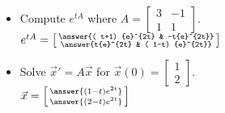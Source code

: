 \documentclass{ximera}
\begin{document}
\begin{exercise}%
    \begin{itemize}
        \item Compute $e^{tA}$ where
        $A=\left[ \begin{smallmatrix}
            3 & -1 \\
            1 & 1 
        \end{smallmatrix}\right]$.\\
        $e^{tA}=
        \left[ \begin{smallmatrix}
            \answer{( t+1) {e}^{2t} & -t{e}^{2t}} \\
            \answer{t{e}^{2t} & ( 1-t) {e}^{2t}}
        \end{smallmatrix}\right]$
        
        \item Solve $\vec{x}' = A \vec{x}$ for $\vec{x}(0) =
        \left[ \begin{smallmatrix}
            1 \\ 
            2
        \end{smallmatrix}\right]$.\\
        $\vec{x}=
        \left[ \begin{smallmatrix}
            \answer{(1-t) {e}^{2t}} \\
            \answer{(2-t) {e}^{2t}}
        \end{smallmatrix}\right]$
        
    \end{itemize}
\end{exercise}
\end{document}
